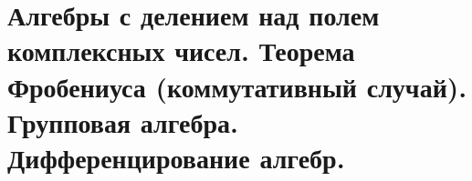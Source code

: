 \section{
    Алгебры с делением над полем комплексных чисел. Теорема Фробениуса (коммутативный случай). Групповая алгебра. Дифференцирование алгебр.
}





